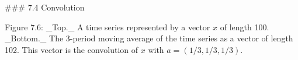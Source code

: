 

### 7.4 Convolution

Figure 7.6: _Top._ A time series represented by a vector \(x\) of length 100. _Bottom._ The 3-period moving average of the time series as a vector of length 102. This vector is the convolution of \(x\) with \(a=(1/3,1/3,1/3)\).

